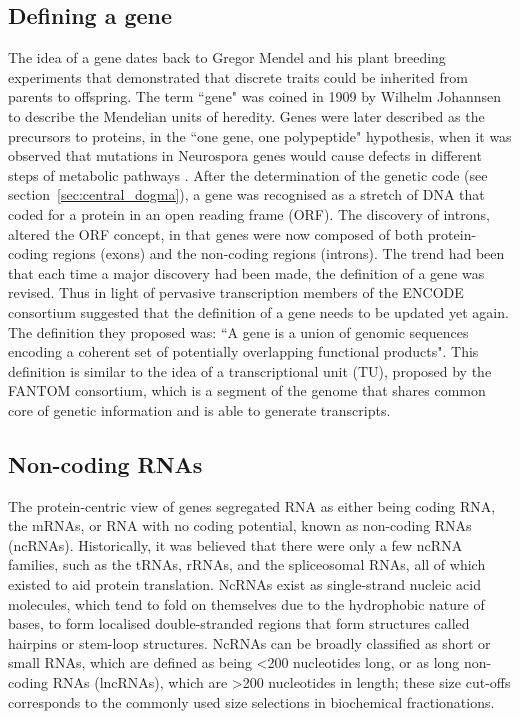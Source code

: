 \subsection{Defining a gene}

The idea of a gene dates back to Gregor Mendel and his plant breeding experiments that demonstrated that discrete traits could be inherited from parents to offspring. The term ``gene" was coined in 1909 by Wilhelm Johannsen to describe the Mendelian units of heredity. Genes were later described as the precursors to proteins, in the ``one gene, one polypeptide" hypothesis, when it was observed that mutations in Neurospora genes would cause defects in different steps of metabolic pathways \cite{Beadle15111941}. After the determination of the genetic code (see section~\ref{sec:central_dogma}), a gene was recognised as a stretch of DNA that coded for a protein in an open reading frame (ORF). The discovery of introns\cite{pmid890740,pmid922889}, altered the ORF concept, in that genes were now composed of both protein-coding regions (exons) and the non-coding regions (introns). The trend had been that each time a major discovery had been made, the definition of a gene was revised. Thus in light of pervasive transcription members of the ENCODE consortium suggested that the definition of a gene needs to be updated yet again\cite{pmid17567988}. The definition they proposed was: ``A gene is a union of genomic sequences encoding a coherent set of potentially overlapping functional products"\cite{pmid17567988}. This definition is similar to the idea of a transcriptional unit (TU), proposed by the FANTOM consortium, which is a segment of the genome that shares common core of genetic information and is able to generate transcripts\cite{pmid12466851}.

\subsection{Non-coding RNAs}

The protein-centric view of genes segregated RNA as either being coding RNA, the mRNAs,  or RNA with no coding potential, known as non-coding RNAs (ncRNAs). Historically, it was believed that there were only a few ncRNA families, such as the tRNAs, rRNAs, and the spliceosomal RNAs, all of which existed to aid protein translation. NcRNAs exist as single-strand nucleic acid molecules, which tend to fold on themselves due to the hydrophobic nature of bases, to form localised double-stranded regions that form structures called hairpins or stem-loop structures. NcRNAs can be broadly classified as short or small RNAs, which are defined as being \textless200 nucleotides long, or as long non-coding RNAs (lncRNAs), which are \textgreater200 nucleotides in length; these size cut-offs corresponds to the commonly used size selections in biochemical fractionations.

